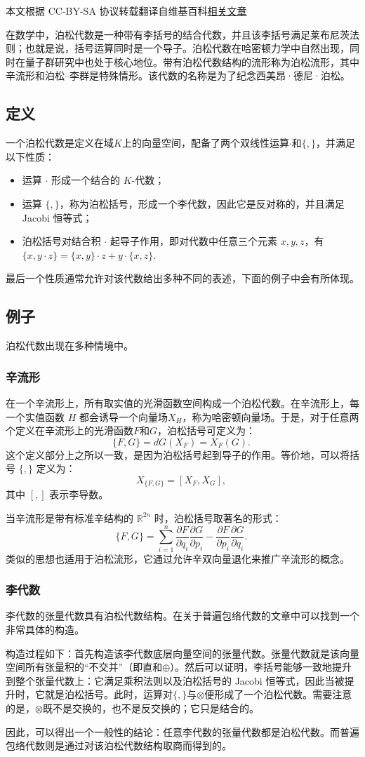 
本文根据 CC-BY-SA 协议转载翻译自维基百科\href{https://en.wikipedia.org/wiki/Poisson_algebra}{相关文章}

在数学中，泊松代数是一种带有李括号的结合代数，并且该李括号满足莱布尼茨法则；也就是说，括号运算同时是一个导子。泊松代数在哈密顿力学中自然出现，同时在量子群研究中也处于核心地位。带有泊松代数结构的流形称为泊松流形，其中辛流形和泊松–李群是特殊情形。该代数的名称是为了纪念西美昂·德尼·泊松。
\subsection{定义}
一个泊松代数是定义在域$K$上的向量空间，配备了两个双线性运算$\cdot$和$\{,\}$，并满足以下性质：
\begin{itemize}
\item 运算 $\cdot$ 形成一个结合的 $K$-代数；
\item 运算 $\{,\}$，称为泊松括号，形成一个李代数，因此它是反对称的，并且满足Jacobi 恒等式；
\item 泊松括号对结合积 $\cdot$ 起导子作用，即对代数中任意三个元素 $x, y, z$，有$\{x, y \cdot z\} = \{x, y\} \cdot z + y \cdot \{x, z\}$.
\end{itemize}
最后一个性质通常允许对该代数给出多种不同的表述，下面的例子中会有所体现。
\subsection{例子}
泊松代数出现在多种情境中。
\subsubsection{辛流形}
在一个辛流形上，所有取实值的光滑函数空间构成一个泊松代数。在辛流形上，每一个实值函数 $H$ 都会诱导一个向量场$X_H$，称为哈密顿向量场。于是，对于任意两个定义在辛流形上的光滑函数$F$和$G$，泊松括号可定义为：
$$
\{F,G\} = dG(X_F) = X_F(G).~
$$
这个定义部分上之所以一致，是因为泊松括号起到导子的作用。等价地，可以将括号 $\{,\}$ 定义为：
$$
X_{\{F,G\}} = [X_F, X_G],~
$$
其中 $[,]$ 表示李导数。

当辛流形是带有标准辛结构的 $\mathbb{R}^{2n}$ 时，泊松括号取著名的形式：
$$
\{F,G\} = \sum_{i=1}^n 
\frac{\partial F}{\partial q_i}\frac{\partial G}{\partial p_i} - 
\frac{\partial F}{\partial p_i}\frac{\partial G}{\partial q_i}.~
$$
类似的思想也适用于泊松流形，它通过允许辛双向量退化来推广辛流形的概念。
\subsubsection{李代数}
李代数的张量代数具有泊松代数结构。在关于普遍包络代数的文章中可以找到一个非常具体的构造。

构造过程如下：首先构造该李代数底层向量空间的张量代数。张量代数就是该向量空间所有张量积的“不交并”（即直和$\oplus$）。然后可以证明，李括号能够一致地提升到整个张量代数上：它满足乘积法则以及泊松括号的 Jacobi 恒等式，因此当被提升时，它就是泊松括号。此时，运算对$\{,\}$与$\otimes$便形成了一个泊松代数。需要注意的是，$\otimes$既不是交换的，也不是反交换的；它只是结合的。

因此，可以得出一个一般性的结论：任意李代数的张量代数都是泊松代数。而普遍包络代数则是通过对该泊松代数结构取商而得到的。
